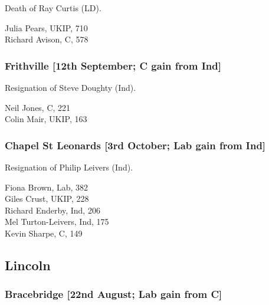 \documentclass[a4paper,openany,10pt]{book}
\begin{document}
Death of Ray Curtis (LD).



Julia Pears, UKIP, 710\\
Richard Avison, C, 578\\


\subsubsection*{Frithville \hspace*{\fill}\nolinebreak[1]%
\enspace\hspace*{\fill}
[12th September; C gain from Ind]}


Resignation of Steve Doughty (Ind).



Neil Jones, C, 221\\
Colin Mair, UKIP, 163\\


\subsubsection*{Chapel St Leonards \hspace*{\fill}\nolinebreak[1]%
\enspace\hspace*{\fill}
[3rd October; Lab gain from Ind]}


Resignation of Philip Leivers (Ind).



Fiona Brown, Lab, 382\\
Giles Crust, UKIP, 228\\
Richard Enderby, Ind, 206\\
Mel Turton-Leivers, Ind, 175\\
Kevin Sharpe, C, 149\\


\subsection*{Lincoln}

\subsubsection*{Bracebridge \hspace*{\fill}\nolinebreak[1]%
\enspace\hspace*{\fill}
[22nd August; Lab gain from C]}
\end{document}
